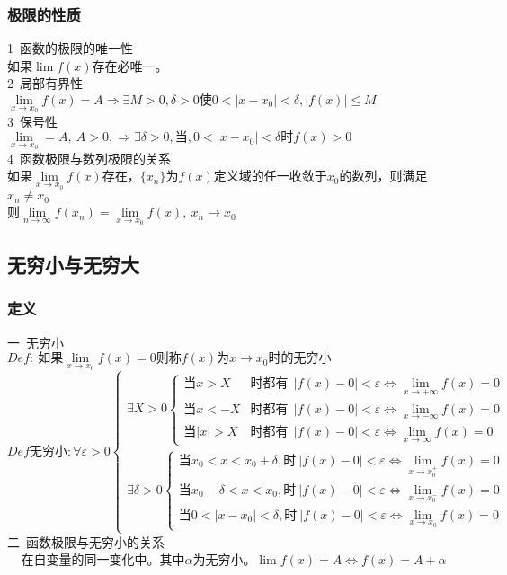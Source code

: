 \subsubsection{极限的性质}
1\ 函数的极限的唯一性\\
如果$\lim f(x)$存在必唯一。\\
2\ 局部有界性\\
$\lim\limits_{x\to x_0}f(x)=A\Rightarrow\exists M>0,\delta >0\mbox{使}0<\left|x-x_0\right|<\delta,\left|f(x)\right|\leqslant M$\\
3\ 保号性\\
$\lim\limits_{x\to x_0}=A,\ A>0,\Rightarrow \exists \delta >0,\mbox{当},0<\left|x-x_0\right|<\delta\mbox{时}f(x)>0$
\\4\ 函数极限与数列极限的关系\\
如果$\lim\limits_{x\to x_0}f(x)$存在，$\{x_n\}$为$f(x)$定义域的任一收敛于$x_0$的数列，则满足$x_n\neq x_0$\\
则$\lim\limits_{n\to \infty}f(x_n)=\lim\limits_{x\to x_0}f(x),\ x_n\rightarrow x_0$

\subsection{无穷小与无穷大}
\subsubsection{定义}
一\ 无穷小\\
$Def:\ \mbox{如果}\lim\limits_{x\to x_0}f(x)= 0\mbox{则称}f(x)\mbox{为}x\rightarrow x_0\mbox{时的无穷小}$\\
$Def\mbox{无穷小}: \forall \varepsilon >0\begin{cases}
    \exists X>0\begin{cases}
        \mbox{当}x>X&\mbox{时都有}\ \ \left|f(x)-0\right|<\varepsilon \Leftrightarrow \lim\limits_{x\to +\infty}f(x)=0\\
        \mbox{当}x<-X&\mbox{时都有}\ \ \left|f(x)-0\right|<\varepsilon \Leftrightarrow \lim\limits_{x\to -\infty}f(x)=0\\
        \mbox{当}\left|x\right|>X&\mbox{时都有}\ \ \left|f(x)-0\right|<\varepsilon \Leftrightarrow \lim\limits_{x\to \infty}f(x)=0
    \end{cases}\\
    \exists\delta>0\begin{cases}
        \mbox{当}x_0<x<x_0+\delta,\mbox{时}\ \left|f(x)-0\right|<\varepsilon\Leftrightarrow\lim\limits_{x\to x_0^+}f(x)=0\\
        \mbox{当}x_0-\delta<x<x_0 ,\mbox{时}\ \left|f(x)-0\right|<\varepsilon\Leftrightarrow\lim\limits_{x\to x_0^-}f(x)=0\\
        \mbox{当}0<\left|x-x_0\right|<\delta,\mbox{时}\ \left|f(x)-0\right|<\varepsilon\Leftrightarrow\lim\limits_{x\to x_0}f(x)=0
    \end{cases}
\end{cases}$\\
二\ 函数极限与无穷小的关系
\begin{align}
    \mbox{在自变量的同一变化中。其中$\alpha$为无穷小。}\lim f(x)=A\Leftrightarrow f(x)=A+\alpha \label{limit_infinitesimal}
\end{align}

